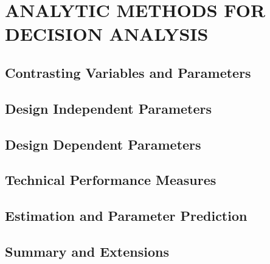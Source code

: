 \chapter{ANALYTIC METHODS FOR DECISION ANALYSIS}\label{chap:9}

\section{Contrasting Variables and Parameters}


\section{Design Independent Parameters}


\section{Design Dependent Parameters}


\section{Technical Performance Measures}


\section{Estimation and Parameter Prediction}


\section{Summary and Extensions}


